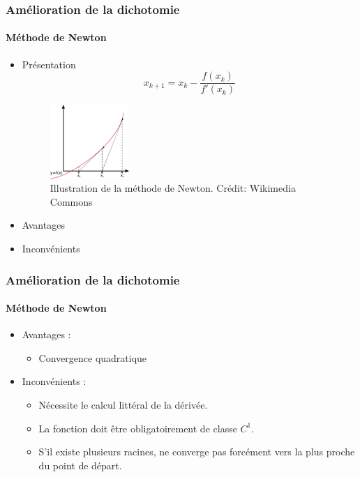 \documentclass[french]{beamer}
\begin{document}
\begin{frame}
\frametitle{Amélioration de la dichotomie}
\framesubtitle{Méthode de Newton}

   \begin{itemize}
      \item Présentation
      \\
      \begin{equation}
         x_{k+1} = x_k - \frac{f(x_k)}{f'(x_k)}
      \end{equation}

      \begin{figure}[htb!]
         \includegraphics[width=3cm]{figures/Newton_method.png}
         \caption{Illustration de la méthode de Newton. Crédit: Wikimedia Commons}
      \end{figure}
      
      \item Avantages
      \item Inconvénients
   \end{itemize}
\end{frame}


\begin{frame}
\frametitle{Amélioration de la dichotomie}
\framesubtitle{Méthode de Newton}

   \begin{itemize}
      \item Avantages :
         \begin{itemize}
            \item Convergence quadratique
         \end{itemize}
      \item Inconvénients :
      \begin{itemize}
         \item Nécessite le calcul littéral de la dérivée.
         \item La fonction doit être obligatoirement de classe $C^1$.
         \item S'il existe plusieurs racines, ne converge pas forcément vers la plus proche du point de départ.
      \end{itemize}
   \end{itemize}
\end{frame}
\end{document}

